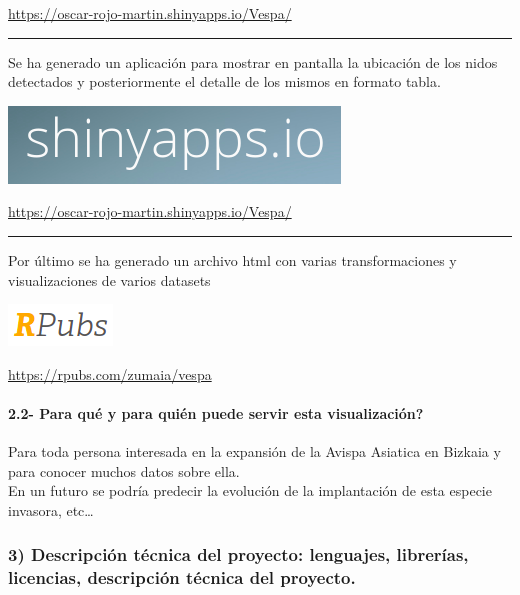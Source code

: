 \documentclass[
]{article}
\begin{document}
\url{https://oscar-rojo-martin.shinyapps.io/Vespa/}

\begin{center}\rule{0.5\linewidth}{0.5pt}\end{center}

Se ha generado un aplicación para mostrar en pantalla la ubicación de
los nidos detectados y posteriormente el detalle de los mismos en
formato tabla.

\href{https://oscar-rojo-martin.shinyapps.io/Vespa/}{\includegraphics{img/shinyapp.png}}

\url{https://oscar-rojo-martin.shinyapps.io/Vespa/}

\begin{center}\rule{0.5\linewidth}{0.5pt}\end{center}

Por último se ha generado un archivo html con varias transformaciones y
visualizaciones de varios datasets

\href{https://rpubs.com/zumaia/vespa}{\includegraphics{img/rpubs.png}}

\url{https://rpubs.com/zumaia/vespa}

\hypertarget{para-quuxe9-y-para-quiuxe9n-puede-servir-esta-visualizaciuxf3n}{%
\paragraph{2.2- Para qué y para quién puede servir esta
visualización?}\label{para-quuxe9-y-para-quiuxe9n-puede-servir-esta-visualizaciuxf3n}}

Para toda persona interesada en la expansión de la Avispa Asiatica en
Bizkaia y para conocer muchos datos sobre ella.\\
En un futuro se podría predecir la evolución de la implantación de esta
especie invasora, etc\ldots{}

\pagebreak

\hypertarget{descripciuxf3n-tuxe9cnica-del-proyecto-lenguajes-libreruxedas-licencias-descripciuxf3n-tuxe9cnica-del-proyecto.}{%
\subsubsection{3) Descripción técnica del proyecto: lenguajes,
librerías, licencias, descripción técnica del
proyecto.}\label{descripciuxf3n-tuxe9cnica-del-proyecto-lenguajes-libreruxedas-licencias-descripciuxf3n-tuxe9cnica-del-proyecto.}}
\end{document}
